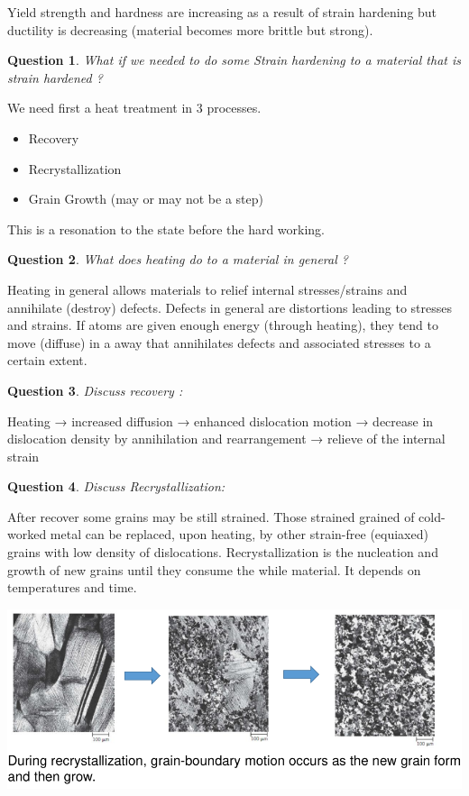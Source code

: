 \documentclass[13]{article}
\newtheorem{exer}{Question}
\begin{document}
Yield strength and hardness are increasing as a result of strain hardening
but ductility is decreasing (material becomes more brittle but strong).
\begin{exer}
What if we needed to do some Strain hardening to a material that is strain hardened ?
\end{exer}
We need first a heat treatment in 3 processes. 
\begin{itemize}

\item Recovery 
\item Recrystallization
\item Grain Growth (may or may not be a step)

\end{itemize}
This is a resonation to the state before the hard working. 
\begin{exer}
What does heating do to a material in general ?
\end{exer}
Heating in general
allows materials to relief internal stresses/strains and annihilate (destroy)  defects.
Defects in general are distortions leading to stresses and strains. If atoms
are given enough energy (through heating), they tend to move (diffuse) in a
away that annihilates defects and associated stresses to a certain extent. 
\begin{exer}
Discuss recovery :
\end{exer}
Heating → increased diffusion → enhanced dislocation motion → decrease in
dislocation density by annihilation and rearrangement → relieve of the
internal strain
\begin{exer}
Discuss Recrystallization:
\end{exer}
After recover some grains may be still strained. Those strained grained of cold-worked metal can be replaced, upon heating, by other strain-free (equiaxed) grains with low density of dislocations. Recrystallization is the nucleation and growth of new grains until they consume the while material. It depends on temperatures and time. 
\begin{center}
\includegraphics[scale=0.5]{figures/24.png}
\end{center}
\end{document}
